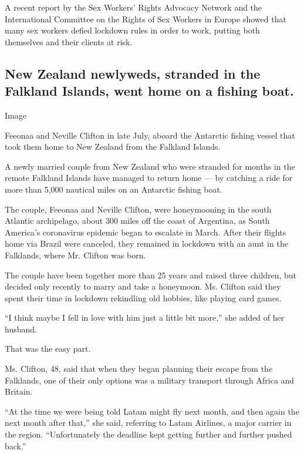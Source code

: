 A recent report by the Sex Workers' Rights Advocacy Network and the
International Committee on the Rights of Sex Workers in Europe showed
that many sex workers defied lockdown rules in order to work, putting
both themselves and their clients at risk.

\hypertarget{new-zealand-newlyweds-stranded-in-the-falkland-islands-went-home-on-a-fishing-boat}{%
\subsection{New Zealand newlyweds, stranded in the Falkland Islands,
went home on a fishing
boat.}\label{new-zealand-newlyweds-stranded-in-the-falkland-islands-went-home-on-a-fishing-boat}}

Image

Feeonaa and Neville Clifton in late July, aboard the Antarctic fishing
vessel that took them home to New Zealand from the Falkland Islands.

A newly married couple from New Zealand who were stranded for months in
the remote Falkland Islands have managed to return home --- by catching
a ride for more than 5,000 nautical miles on an Antarctic fishing boat.

The couple, Feeonaa and Neville Clifton, were honeymooning in the south
Atlantic archipelago, about 300 miles off the coast of Argentina, as
South America's coronavirus epidemic began to escalate in March. After
their flights home via Brazil were canceled, they remained in lockdown
with an aunt in the Falklands, where Mr. Clifton was born.

The couple have been together more than 25 years and raised three
children, but decided only recently to marry and take a honeymoon. Ms.
Clifton said they spent their time in lockdown rekindling old hobbies,
like playing card games.

``I think maybe I fell in love with him just a little bit more,'' she
added of her husband.

That was the easy part.

Ms. Clifton, 48, said that when they began planning their escape from
the Falklands, one of their only options was a military transport
through Africa and Britain.

``At the time we were being told Latam might fly next month, and then
again the next month after that,'' she said, referring to Latam
Airlines, a major carrier in the region. ``Unfortunately the deadline
kept getting further and further pushed back.''

